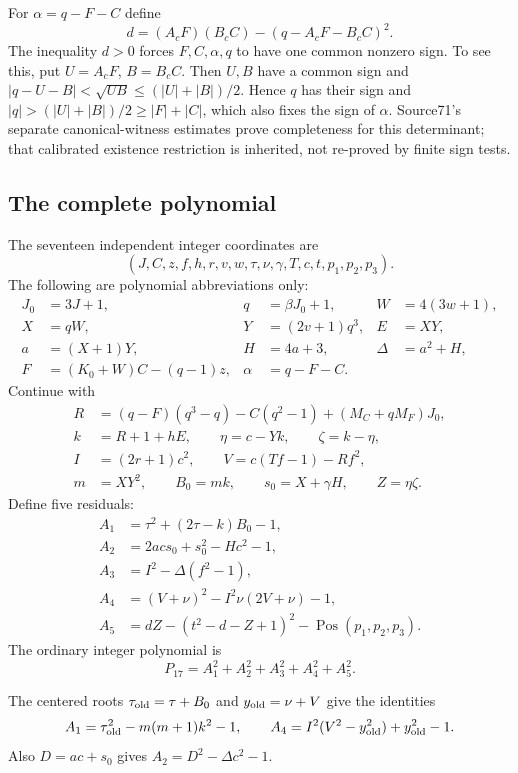 For $\alpha=q-F-C$ define
\[
 d=(A_cF)(B_cC)-(q-A_cF-B_cC)^2.
\]
The inequality $d>0$ forces $F,C,\alpha,q$ to have one common nonzero
sign. To see this, put $U=A_cF$, $B=B_cC$. Then $U,B$ have a common
sign and $|q-U-B|<\sqrt{UB}\le(|U|+|B|)/2$. Hence $q$ has their sign
and $|q|>(|U|+|B|)/2\ge|F|+|C|$, which also fixes the sign of
$\alpha$. Source71's separate canonical-witness estimates prove
completeness for this determinant; that calibrated existence restriction
is inherited, not re-proved by finite sign tests.

\subsection{The complete polynomial}

The seventeen independent integer coordinates are
\[
 (J,C,z,f,h,r,v,w,\tau,\nu,\gamma,T,c,t,p_1,p_2,p_3).
\]
The following are polynomial abbreviations only:
\begin{align*}
 J_0&=3J+1,&q&=\beta J_0+1,&W&=4(3w+1),\\
 X&=qW,&Y&=(2v+1)q^3,&E&=XY,\\
 a&=(X+1)Y,&H&=4a+3,&\Delta&=a^2+H,\\
 F&=(K_0+W)C-(q-1)z,&\alpha&=q-F-C.&&
\end{align*}
Continue with
\begin{align*}
 R&=(q-F)(q^3-q)-C(q^2-1)+(M_C+qM_F)J_0,\\
 k&=R+1+hE,\qquad \eta=c-Yk,\qquad \zeta=k-\eta,\\
 I&=(2r+1)c^2,\qquad V=c(Tf-1)-Rf^2,\\
 m&=XY^2,\qquad B_0=mk,\qquad s_0=X+\gamma H,\qquad Z=\eta\zeta.
\end{align*}
Define five residuals:
\begin{align}
 A_1&=\tau^2+(2\tau-k)B_0-1,\nonumber\\
 A_2&=2acs_0+s_0^2-Hc^2-1,\nonumber\\
 A_3&=I^2-\Delta(f^2-1),\label{eq:integer17-rows}\\
 A_4&=(V+\nu)^2-I^2\nu(2V+\nu)-1,\nonumber\\
 A_5&=dZ-(t^2-d-Z+1)^2-\operatorname{Pos}(p_1,p_2,p_3).\nonumber
\end{align}
The ordinary integer polynomial is
\begin{equation}\label{eq:integer17}
 \boxed{P_{17}=A_1^2+A_2^2+A_3^2+A_4^2+A_5^2.}
\end{equation}

The centered roots $\tau_{\rm old}=\tau+B_0$ and
$y_{\rm old}=\nu+V$ give the identities
\[
 A_1=\tau_{\rm old}^2-m(m+1)k^2-1,\qquad
 A_4=I^2(V^2-y_{\rm old}^2)+y_{\rm old}^2-1.
\]
Also $D=ac+s_0$ gives $A_2=D^2-\Delta c^2-1$.

